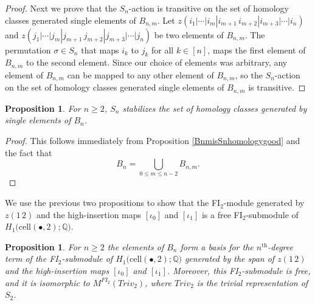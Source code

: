 \documentclass[12py]{amsart}%
\newtheorem{prop}[thm]{Proposition}
\theoremstyle{definition}\newtheorem{definition}[thm]{Definition}
\theoremstyle{definition}
\newcommand{\Q}{\ensuremath{\mathbb{Q}}}
\begin{document}
\begin{proof}
Next we prove that the $S_{n}$-action is transitive on the set of homology classes  generated single elements of $B_{n,m}$. Let $z(i_{1}|\cdots|i_{m}|i_{m+1}\,i_{m+2}|i_{m+3}|\cdots|i_{n})$ and $z(j_{1}|\cdots|j_{m}|j_{m+1}\,j_{m+2}|j_{m+3}|\cdots|j_{n})$ be two elements of $B_{n,m}$. The permutation $\sigma\in S_{n}$ that maps $i_{k}$ to $j_{k}$ for all $k\in[n]$, maps the first element of $B_{n,m}$ to the second element. Since our choice of elements was arbitrary, any element of $B_{n,m}$ can be mapped to any other element of $B_{n,m}$, so the $S_{n}$-action on the set of homology classes  generated single elements of $B_{n,m}$ is transitive.
\end{proof}

\begin{prop}\label{BnisSnhomologygood}
For $n\ge 2$, $S_{n}$ stabilizes the set of homology classes generated by single elements of $B_{n}$.
\end{prop}

\begin{proof}
This follows immediately from Proposition \ref{BnmisSnhomologygood} and the fact that
\[
B_{n}=\bigcup_{0\le m\le n-2}B_{n,m}.
\]
\end{proof}

We use the previous two propositions to show that the FI$_{2}$-module generated by $z(1\,2)$ and the high-insertion maps $[\iota_{0}]$ and $[\iota_{1}]$ is a free FI$_{2}$-submodule of $H_{1}\big(\text{cell}(\bullet,2);\Q\big)$.

\begin{prop}\label{BnisabasisforthefreeFI2mod}
For $n\ge 2$ the elements of $B_{n}$ form a basis for the $n^{\text{th}}$-degree term of the FI$_{2}$-submodule of $H_{1}\big(\text{cell}(\bullet,2);\Q\big)$ generated by the span of $z(1\,2)$ and the high-insertion maps $[\iota_{0}]$ and $[\iota_{1}]$. Moreover, this FI$_{2}$-submodule is free, and it is isomorphic to $M^{FI_{2}}(Triv_{2})$, where $Triv_{2}$ is the trivial representation of $S_{2}$.
\end{prop}
\end{document}
